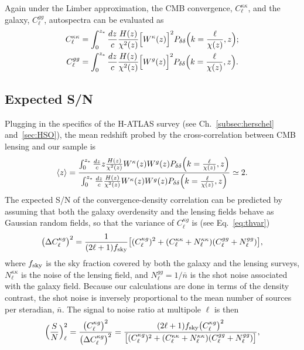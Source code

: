 Again under the Limber approximation, the \gls{CMB} convergence, $C_{\ell}^{\kappa\kappa}$, and the galaxy, $C_{\ell}^{gg}$, autospectra can be evaluated as
\begin{equation}
\begin{split}
C_{\ell}^{\kappa\kappa} &= \int_0^{z_*} \frac{dz}{c}\frac{H(z)}{\chi^2(z)}\Bigl[W^{\kappa}(z)\Bigr]^2P_{\delta\delta}\Bigl(k=\frac{\ell}{\chi(z)},z\Bigr); \\
C_{\ell}^{gg} &= \int_0^{z_*} \frac{dz}{c}\frac{H(z)}{\chi^2(z)}\Bigl[W^{g}(z)\Bigr]^2P_{\delta\delta}\Bigl(k=\frac{\ell}{\chi(z)},z\Bigr).
\end{split}
\label{eqn:kkgg}
\end{equation}
%
\subsection{Expected S/N}
Plugging in the specifics of the H-ATLAS survey (see Ch.~\eqref{subsec:herschel} and~\eqref{sec:HSO}), the mean redshift probed by the cross-correlation between \gls{CMB} lensing and our sample is
\begin{equation}\label{eqn:meanz}
\langle z \rangle = \frac{\int_0^{z_*} \frac{dz}{c} z\frac{H(z)}{\chi^2(z)}W^{\kappa}(z)W^{g}(z)P_{\delta\delta}\Bigl(k=\frac{\ell}{\chi(z)},z\Bigr)}{\int_0^{z_*} \frac{dz}{c}\frac{H(z)}{\chi^2(z)}W^{\kappa}(z)W^{g}(z)P_{\delta\delta}\Bigl(k=\frac{\ell}{\chi(z)},z\Bigr)} \simeq 2.
\end{equation}
%
The expected S/N of the convergence-density correlation can be predicted by assuming that both the galaxy {overdensity} and the lensing fields behave as Gaussian random fields, so that the variance of $C_{\ell}^{\kappa g}$ is (see Eq.~\eqref{eq:thvar})
\begin{equation}
\label{eqn:delta_kgxc1}
\bigl(\Delta C_{\ell}^{\kappa g}\bigr)^2 = \frac{1}{(2\ell+1)f_{\rm{sky}}} \bigl[(C_{\ell}^{\kappa g})^2 + (C_{\ell}^{\kappa\kappa}+N_{\ell}^{\kappa\kappa})(C_{\ell}^{gg}+N_{\ell}^{gg})\bigr],
\end{equation}
where $f_{\rm{sky}}$ is the sky fraction covered by both the galaxy and the lensing surveys, $N_{\ell}^{\kappa\kappa}$ is the noise of the lensing field, and $N_{\ell}^{gg}=1/\bar{n}$ is the shot noise associated with the galaxy field. Because our calculations are done in terms of the density contrast, the shot noise is inversely proportional to the mean number of sources per steradian, $\bar{n}$. The signal to noise ratio at multipole $\ell$ is then
\begin{equation}
\label{eqn:s_to_n_mult}
\Bigl( \frac{S}{N} \Bigr)^2_{\ell} = \frac{\bigl(C_{\ell}^{\kappa g}\bigr)^2}{\bigl(\Delta C_{\ell}^{\kappa g}\bigr)^2} = \frac{(2\ell+1)f_{\rm{sky}}\bigl(C_{\ell}^{\kappa g}\bigr)^2 }{\bigl[(C_{\ell}^{\kappa g})^2 + (C_{\ell}^{\kappa\kappa}+N_{\ell}^{\kappa\kappa})(C_{\ell}^{gg}+N_{\ell}^{gg})\bigr]},
\end{equation}
